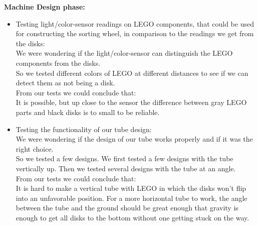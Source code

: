 \textbf{Machine Design phase:}
\begin{itemize}

\begin{comment}
\begin{itemize}
	\item Testing light/color-sensor readings on LEGO components, that could be used for constructing the sorting wheel in comparison to the readings we get from the disks.
	\item Testing the functionality of our tube design.
	\item Testing different ways of how to count the amount of disk inserted into the tube.   %
	\item Testing different ways of pushing disks into the tube and past the pressure-sensor.
	\item Testing how the system handles disk that get inserted with the open end down instead of up.
    \item Testing different designs of the sorting wheel.
\end{itemize}
\end{comment}


\item{Testing light/color-sensor readings on LEGO components, that could be used for constructing the sorting wheel, in comparison to the readings we get from the disks:\\ %
We were wondering if the light/color-sensor can distinguish the LEGO components from the disks.\\
So we tested different colors of LEGO at different distances to see if we can detect them as not being a disk.\\
From our tests we could conclude that:\\
It is possible, but up close to the sensor the difference between gray LEGO parts and black disks is to small to be reliable.}\\


\item{Testing the functionality of our tube design:\\
We were wondering if the design of our tube works properly and if it was the right choice.\\
So we tested a few designs. We first tested a few designs with the tube vertically up. Then we tested several designs with the tube at an angle.\\
From our tests we could conclude that:\\
It is hard to make a vertical tube with LEGO in which the disks won't flip into an unfavorable position.
For a more horizontal tube to work, the angle between the tube and the ground should be great enough that gravity is enough to get all disks to the bottom without one getting stuck on the way.}\\



\end{itemize}

